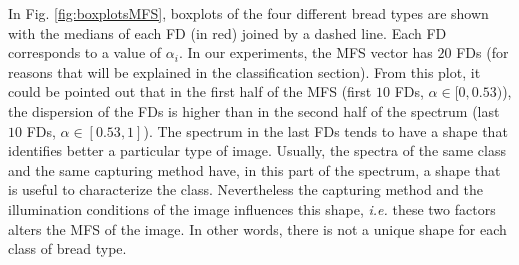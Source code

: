 In Fig. \ref{fig:boxplotsMFS}, boxplots of the four different bread types are shown with the medians of each FD (in red) joined by a dashed line. Each FD corresponds to a value of $\alpha_{i}$. In our experiments, the MFS vector has $20$ FDs (for reasons that will be explained in the classification section). From this plot, it could be pointed out that in the first half of the MFS (first $10$ FDs, $\alpha \in [0,0.53)$), the dispersion of the FDs is higher than in the second half of the spectrum (last $10$ FDs, $\alpha \in [0.53,1]$). The spectrum in the last FDs tends to have a shape that identifies better a particular type of image. Usually, the spectra of the same class and the same capturing method have, in this part of the spectrum, a shape that is useful to characterize the class. Nevertheless the capturing method and the illumination conditions of the image influences this shape, {\em i.e.} these two factors alters the MFS of the image. In other words, there is not a unique shape for each class of bread type.


